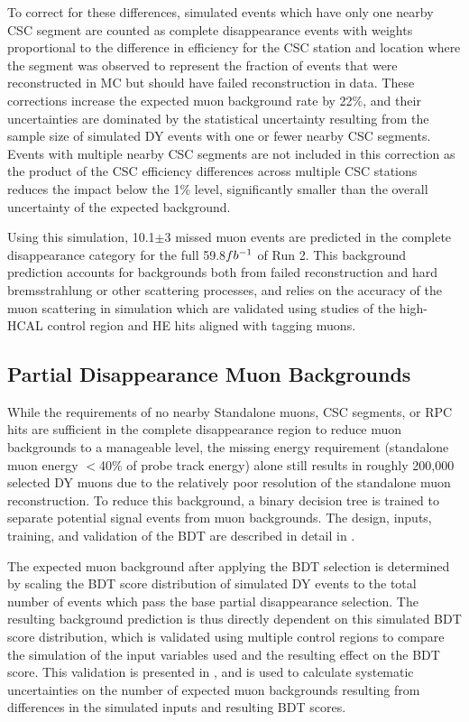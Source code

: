 To correct for these differences, simulated events which have only one nearby CSC segment are counted as complete disappearance events with weights proportional to the difference in efficiency for the CSC station and location where the segment was observed to represent the fraction of events that were reconstructed in MC but should have failed reconstruction in data.
These corrections increase the expected muon background rate by 22$\%$, and their uncertainties are dominated by the statistical uncertainty resulting from the sample size of simulated DY events with one or fewer nearby CSC segments.
Events with multiple nearby CSC segments are not included in this correction as the product of the CSC efficiency differences across multiple CSC stations reduces the impact below the 1$\%$ level, significantly smaller than the overall uncertainty of the expected background.

Using this simulation, 10.1$\pm$3 missed muon events are predicted in the complete disappearance category for the full 59.8$fb^{-1}$ of Run 2. 
This background prediction accounts for backgrounds both from failed reconstruction and hard bremsstrahlung or other scattering processes, and relies on the accuracy of the muon scattering in simulation which are validated using studies of the high-HCAL control region and HE hits aligned with tagging muons.

\subsection{Partial Disappearance Muon Backgrounds}
While the requirements of no nearby Standalone muons, CSC segments, or RPC hits are sufficient in the complete disappearance region to reduce muon backgrounds to a manageable level, the missing energy requirement (standalone muon energy $<$40$\%$ of probe track energy) alone still results in roughly 200,000 selected DY muons due to the relatively poor resolution of the standalone muon reconstruction.
To reduce this background, a binary decision tree is trained to separate potential signal events from muon backgrounds. 
The design, inputs, training, and validation of the BDT are described in detail in .

The expected muon background after applying the BDT selection is determined by scaling the BDT score distribution of simulated DY events to the total number of events which pass the base partial disappearance selection.
The resulting background prediction is thus directly dependent on this simulated BDT score distribution, which is validated using multiple control regions to compare the simulation of the input variables used and the resulting effect on the BDT score.
This validation is presented in , and is used to calculate systematic uncertainties on the number of expected muon backgrounds resulting from differences in the simulated inputs and resulting BDT scores.

